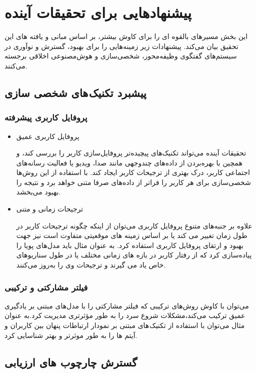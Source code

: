 \section{پیشنهادهایی برای تحقیقات آینده}
این بخش مسیرهای بالقوه ای را برای کاوش بیشتر، بر اساس مبانی و یافته های این تحقیق بیان می‌کند. پیشنهادات زیر زمینه‌هایی را برای بهبود، گسترش و نوآوری در سیستم‌های گفتگوی وظیفه‌محور، شخصی‌سازی و هوش‌مصنوعی اخلاقی برجسته می‌کنند.

\subsection{پیشبرد تکنیک های شخصی سازی}

\subsubsection{پروفایل کاربری پیشرفته}

\begin{itemize}
\item
 پروفایل کاربری عمیق

 تحقیقات آینده می‌تواند تکنیک‌های پیچیده‌تر پروفایل‌سازی کاربر را بررسی کند، و همچین با بهره‌بردن از داده‌های چندوجهی مانند صدا، ویدیو یا فعالیت رسانه‌های اجتماعی کاربر، درک بهتری از ترجیحات کاربر ایجاد کند.
با استفاده از این روش‌ها شخصی‌سازی برای هر کاربر را فراتر از داده‌های صرفا متنی خواهد برد و نتیجه را بهبود می‌بخشد.
\item
 ترجیحات زمانی و متنی

 علاوه بر جنبه‌های متنوع پروفایل ‌کاربری می‌توان از اینکه چگونه ترجیحات کاربر در طول زمان تغییر می کند یا بر اساس زمینه های موقعیتی متفاوت است نیز جهت بهبود و ارتقای پروفایل کاربری استفاده کرد.
به عنوان مثال باید مدل‌های پویا را پیاده‌سازی کرد که از رفتار کاربر در بازه های زمانی مختلف یا در طول سناریوهای خاص یاد می گیرند و ترجیحات وی را به‌روز می‌کنند.
\end{itemize}

\subsubsection{فیلتر مشارکتی و ترکیبی}
می‌توان با کاوش روش‌های ترکیبی که فیلتر مشارکتی را با مدل‌های مبتنی بر یادگیری عمیق ترکیب می‌کند،مشکلات شروع سرد را به طور مؤثرتری مدیریت کرد.به عنوان مثال می‌توان با استفاده از تکنیک های مبتنی بر نمودار ارتباطات پنهان بین کاربران و آیتم ها را به طور موثرتر و بهتر شناسایی کرد.


\subsection{گسترش چارچوب های ارزیابی}


